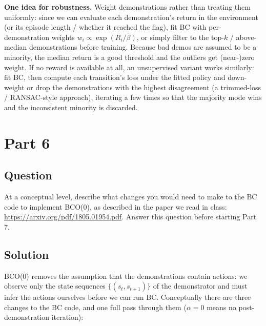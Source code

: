 \documentclass[12pt]{article}%
\begin{document}
\medskip
\noindent\textbf{One idea for robustness.} Weight demonstrations rather than treating them
uniformly: since we can evaluate each demonstration's return in the environment (or its
episode length / whether it reached the flag), fit BC with per-demonstration weights
$w_i \propto \exp(R_i / \beta)$, or simply filter to the top-$k$ / above-median
demonstrations before training. Because bad demos are assumed to be a minority, the median
return is a good threshold and the outliers get (near-)zero weight. If no reward is
available at all, an unsupervised variant works similarly: fit BC, then compute each
transition's loss under the fitted policy and down-weight or drop the demonstrations with
the highest disagreement (a trimmed-loss / RANSAC-style approach), iterating a few times so
that the majority mode wins and the inconsistent minority is discarded.




\section{Part 6}

\subsection{Question}
At a conceptual level, describe what changes you would need to make to the BC
code to implement BCO(0), as described in the paper we read in class:
\url{https://arxiv.org/pdf/1805.01954.pdf}. Answer this question before starting
Part 7.

\subsection{Solution}
BCO(0) removes the assumption that the demonstrations contain actions: we
observe only the state sequences $\{(s_t, s_{t+1})\}$ of the demonstrator and must infer
the actions ourselves before we can run BC. Conceptually there are three changes to the BC
code, and one full pass through them ($\alpha = 0$ means no post-demonstration iteration):
\end{document}
